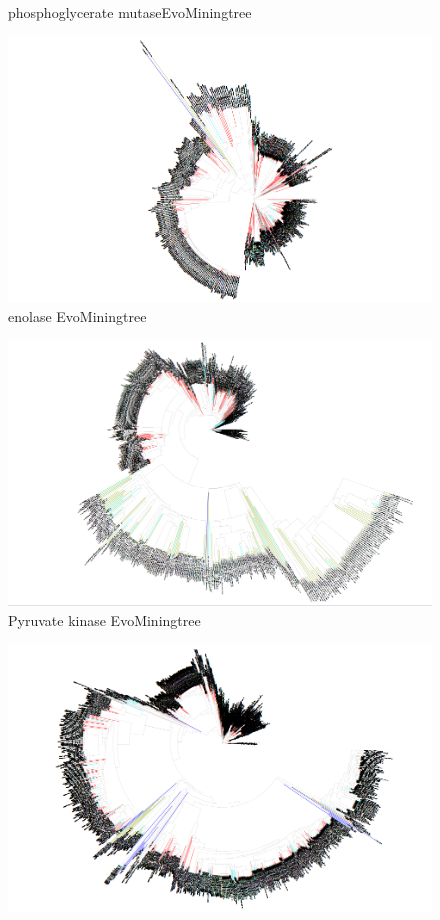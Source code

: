 \documentclass[12pt,twoside]{reedthesis}
\begin{document}
\begin{figure}[h!tbp]
  \caption[phosphoglycerate mutaseEvoMiningtree]{\normalsize{phosphoglycerate mutaseEvoMiningtree}}
  \label{fig:phosphoglycerate_mutase_evo_tree}
  \end{figure}\begin{figure}[h!tbp]
  \centering
  \includegraphics[angle = 180,scale = 0.25]{chapter5/tree14.png}
  \caption[enolase EvoMiningtree]{\normalsize{enolase EvoMiningtree}}
  \label{fig:enolase_evo_tree}
  \end{figure}\begin{figure}[h!tbp]
  \centering
  \includegraphics[angle = 180,scale = 0.25]{chapter5/tree15.png}
  \caption[Pyruvate kinase EvoMiningtree]{\normalsize{Pyruvate kinase EvoMiningtree}}
  \label{fig:Pyruvate_kinase_evo_tree}
  \end{figure}\begin{figure}[h!tbp]
  \centering
  \includegraphics[angle = 180,scale = 0.25]{chapter5/tree16.png}

\end{figure}
\end{document}
